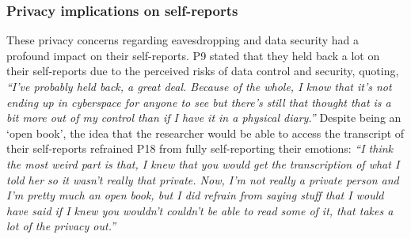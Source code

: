     	
    \subsubsection{Privacy implications on self-reports}
    These privacy concerns regarding eavesdropping and data security had a profound impact on their self-reports. P9 stated that they held back a lot on their self-reports due to the perceived risks of data control and security, quoting,
            \textit{``I've probably held back, a great deal. Because of the whole, I know that it's not ending up in cyberspace for anyone to see but there's still that thought that is a bit more out of my control than if I have it in a physical diary.''}
    Despite being an `open book', the idea that the researcher would be able to access the transcript of their self-reports refrained P18 from fully self-reporting their emotions:
            \textit{``I think the most weird part is that, I knew that you would get the transcription of what I told her so it wasn't really that private. Now, I'm not really a private person and I'm pretty much an open book, but I did refrain from saying stuff that I would have said if I knew you wouldn't couldn't be able to read some of it, that takes a lot of the privacy out.''
            }
    

